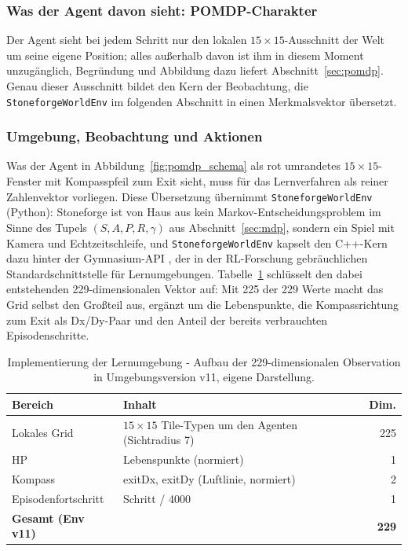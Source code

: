 \documentclass[11pt,a4paper]{article}
\begin{document}
\subsubsection{Was der Agent davon sieht: POMDP-Charakter}
\label{sec:pomdpchar}

Der Agent sieht bei jedem Schritt nur den lokalen $15{\times}15$-Ausschnitt
der Welt um seine eigene Position; alles außerhalb davon ist ihm in diesem
Moment unzugänglich, Begründung und Abbildung dazu liefert
Abschnitt~\ref{sec:pomdp}. Genau dieser Ausschnitt bildet den Kern der
Beobachtung, die \texttt{StoneforgeWorldEnv} im folgenden Abschnitt in einen
Merkmalsvektor übersetzt.

\subsubsection{Umgebung, Beobachtung und Aktionen}
\label{sec:envobs}

Was der Agent in Abbildung~\ref{fig:pomdp_schema} als rot umrandetes
$15{\times}15$-Fenster mit Kompasspfeil zum Exit sieht, muss für das
Lernverfahren als reiner Zahlenvektor vorliegen. Diese Übersetzung
übernimmt \texttt{StoneforgeWorldEnv} (Python): Stoneforge ist von Haus aus
kein Markov-Entscheidungsproblem im Sinne des Tupels
$(S, A, P, R, \gamma)$ aus Abschnitt~\ref{sec:mdp}, sondern ein Spiel mit
Kamera und Echtzeitschleife, und
\texttt{StoneforgeWorldEnv} kapselt den C++-Kern dazu hinter der
Gymnasium-API \cite{brockman2016gym}, der in der RL-Forschung
gebräuchlichen Standardschnittstelle für Lernumgebungen. Tabelle~\ref{tab:obs}
schlüsselt den dabei entstehenden 229-dimensionalen Vektor auf: Mit 225 der
229 Werte macht das Grid selbst den Großteil aus, ergänzt um die
Lebenspunkte, die Kompassrichtung zum Exit als Dx/Dy-Paar und den Anteil
der bereits verbrauchten Episodenschritte.

\begin{table}[h]
\centering
\small
\begin{tabular}{@{}llr@{}}
\toprule
\textbf{Bereich} & \textbf{Inhalt} & \textbf{Dim.} \\
\midrule
Lokales Grid & $15{\times}15$ Tile-Typen um den Agenten (Sichtradius 7) & 225 \\
HP & Lebenspunkte (normiert) & 1 \\
Kompass & exitDx, exitDy (Luftlinie, normiert) & 2 \\
Episodenfortschritt & Schritt / 4000 & 1 \\
\midrule
\textbf{Gesamt (Env v11)} & & \textbf{229} \\
\bottomrule
\end{tabular}
\caption[Aufbau der Observation (Env v11)]{Implementierung der Lernumgebung -
Aufbau der 229-dimensionalen Observation in Umgebungsversion v11, eigene
Darstellung.}
\label{tab:obs}
\end{table}
\end{document}
